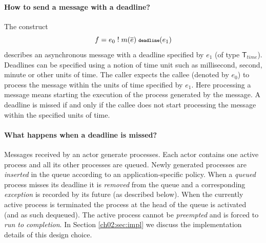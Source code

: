 \paragraph*{How to send a message with a deadline?} 
The construct
$$
f = e_0 \; ! \; m(\overline{e}) \; \textbf{{\scriptsize\texttt{deadline}}}(e_1)
$$
describes an asynchronous message with a deadline specified by $e_1$ (of type $\mathsf{T}_{time}$).
Deadlines  can be specified  using a notion of time unit such as millisecond, second, minute or other units of time.
The caller expects the  callee (denoted by $e_0$) to process   the message  within the  units of time
specified by $e_1$.
Here processing a message means starting the execution of the process generated by the message.
A deadline  is missed if and only if the callee  does not  start  processing  the message within the specified units of time.

\paragraph*{What happens when a deadline is missed?}
Messages received by an actor generate processes.
Each actor contains one active process and all its other processes are queued. 
Newly generated processes are \emph{inserted} in the queue according to an application-specific policy.
When a \emph{queued} process misses its deadline it is \emph{removed} from the queue and a
corresponding \emph{exception} is recorded by its future (as described below).
When the currently active process is terminated the process at the head of the queue is activated
(and as such  dequeued).
The active process  cannot be \emph{preempted} and is forced
to  \emph{run to completion}.
In  Section \ref{ch02:sec:impl} we discuss the implementation details of this design choice.

